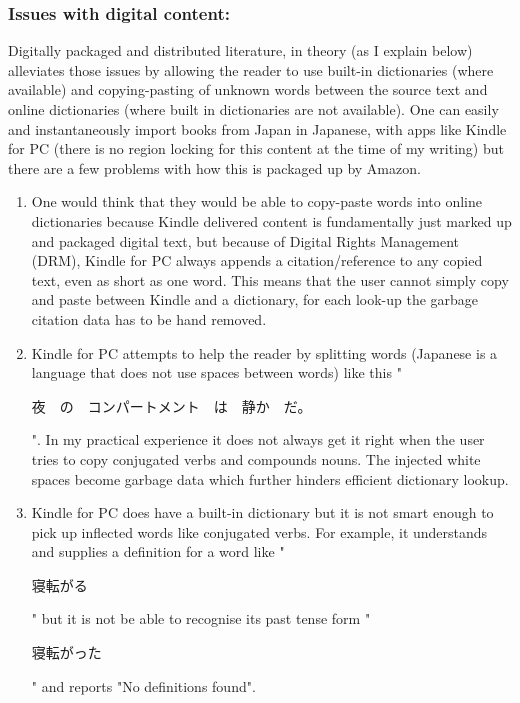 \documentclass{article}
\begin{document}
\begin{enumerate}
\subsubsection{Issues with digital content:}
Digitally packaged and distributed literature, in theory (as I explain below) alleviates those issues by allowing the reader to use built-in dictionaries (where available) and copying-pasting of unknown words between the source text and online dictionaries (where built in dictionaries are not available). One can easily and instantaneously import books from Japan in Japanese, with apps like Kindle for PC (there is no region locking for this content at the time of my writing) but there are a few problems with how this is packaged up by Amazon.
\begin{enumerate}
    \item One would think that they would be able to copy-paste words into online dictionaries because Kindle delivered content is fundamentally just marked up and packaged digital text, but because of Digital Rights Management (DRM), Kindle for PC always appends a citation/reference to any copied text, even as short as one word. This means that the user cannot simply copy and paste between Kindle and a dictionary, for each look-up the garbage citation data has to be hand removed.
    \item Kindle for PC attempts to help the reader by splitting words (Japanese is a language that does not use spaces between words) like this "\begin{CJK*}{UTF8}{min}夜　の　コンパートメント　は　静か　だ。\end{CJK*}". In my practical experience it does not always get it right when the user tries to copy conjugated verbs and compounds nouns. The injected white spaces become garbage data which further hinders efficient dictionary lookup.
    \item Kindle for PC does have a built-in dictionary but it is not smart enough to pick up inflected words like conjugated verbs. For example, it understands and supplies a definition for a word like "\begin{CJK*}{UTF8}{min}寝転がる\end{CJK*}" but it is not be able to recognise its past tense form "\begin{CJK*}{UTF8}{min}寝転がった\end{CJK*}" and reports "No definitions found".
\end{enumerate}
\end{enumerate}
\end{document}
